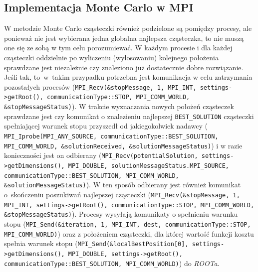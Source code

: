 \documentclass[11pt, a4paper, oneside]{article}
\begin{document}
\subsection{Implementacja Monte Carlo w MPI}
W metodzie Monte Carlo cząsteczki również podzielone są pomiędzy procesy, ale ponieważ nie jest wybierana jedna globalna najlepsza cząsteczka, to nie muszą one się ze sobą w tym celu porozumiewać. W każdym procesie i dla każdej cząsteczki oddzielnie po wyliczeniu (wylosowaniu) kolejnego położenia sprawdzane jest niezależnie czy znaleziono już dostatecznie dobre rozwiązanie. Jeśli tak, to~w~takim przypadku potrzebna jest komunikacja w celu zatrzymania pozostałych procesów (\lstinline[style=mycpp]{MPI_Recv(&stopMessage, 1, MPI_INT, settings->getRoot(), communicationType::STOP, MPI_COMM_WORLD, &stopMessageStatus)}). W trakcie wyznaczania nowych położeń cząsteczek sprawdzane jest czy komunikat o znalezieniu najlepszej \lstinline[style=mycpp]{BEST_SOLUTION} cząsteczki spełniającej warunek stopu przyszedł od jakiegokolwiek nadawcy ( \lstinline[style=mycpp]{MPI_Iprobe(MPI_ANY_SOURCE, communicationType::BEST_SOLUTION, MPI_COMM_WORLD, &solutionReceived, &solutionMessageStatus)}) i w razie konieczności jest on odbierany (\lstinline[style=mycpp]{MPI_Recv(potentialSolution, settings->getDimensions(), MPI_DOUBLE, solutionMessageStatus.MPI_SOURCE, communicationType::BEST_SOLUTION, MPI_COMM_WORLD, &solutionMessageStatus)}). W ten sposób odbierany jest również komunikat o~skończeniu poszukiwań najlepszej cząsteczki (\lstinline[style=mycpp]{MPI_Recv(&stopMessage, 1, MPI_INT, settings->getRoot(), communicationType::STOP, MPI_COMM_WORLD, &stopMessageStatus)}). Procesy wysyłają komunikaty o spełnieniu warunku stopu (\lstinline[style=mycpp]{MPI_Send(&iteration, 1, MPI_INT, dest, communicationType::STOP, MPI_COMM_WORLD)}) oraz z położeniem cząsteczki, dla której wartość funkcji kosztu spełnia warunek stopu (\lstinline[style=mycpp]{MPI_Send(&localBestPosition[0], settings->getDimensions(), MPI_DOUBLE, settings->getRoot(), communicationType::BEST_SOLUTION, MPI_COMM_WORLD)}) do \textit{ROOTa}.
\end{document}
